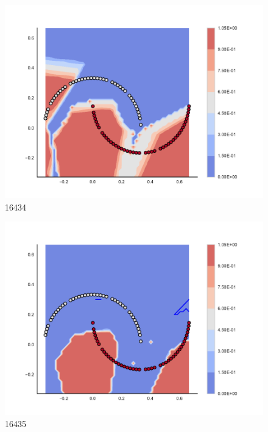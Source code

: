 \begin{subfigure}[b]{0.09\textwidth}
    \includegraphics[clip, trim=2.35cm 1.75cm 4.5cm 0cm,width=\textwidth]{img/convergence/16434.pdf}
    \caption{16434}
    \label{fig:convergence_16434}
\end{subfigure}
%
\begin{subfigure}[b]{0.09\textwidth}
    \includegraphics[clip, trim=2.35cm 1.75cm 4.5cm 0cm,width=\textwidth]{img/convergence/16435.pdf}
    \caption{16435}
    \label{fig:convergence_16435}
\end{subfigure}
%
